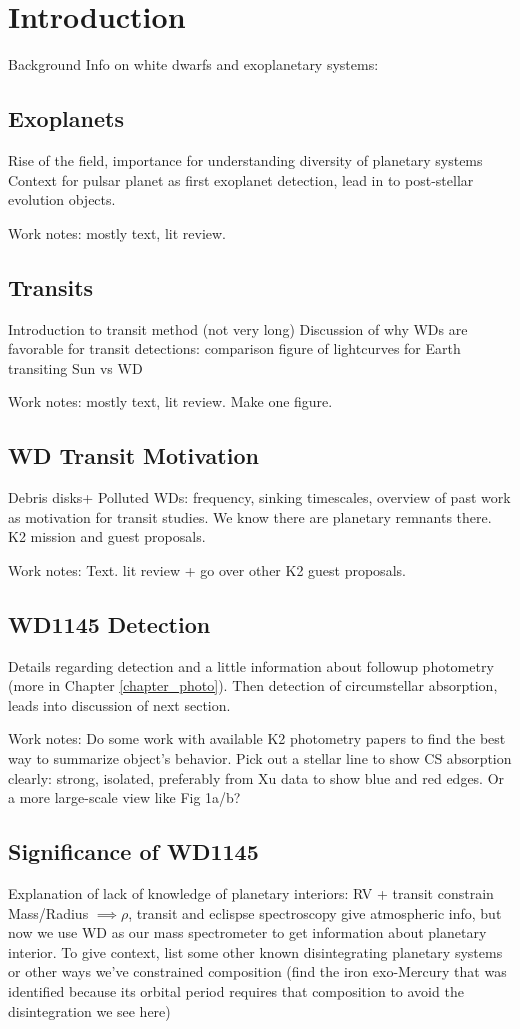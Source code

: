 \chapter{Introduction}
\label{intro}

Background Info on white dwarfs and exoplanetary systems:
\section{Exoplanets}
Rise of the field, importance for understanding diversity of planetary systems
Context for pulsar planet as first exoplanet detection, lead in to post-stellar evolution objects. 

Work notes: mostly text, lit review.
\section{Transits}
Introduction to transit method (not very long)
Discussion of why WDs are favorable for transit detections: comparison figure of lightcurves for Earth transiting Sun vs WD

Work notes: mostly text, lit review. Make one figure.
\section{WD Transit Motivation}
Debris disks+ Polluted WDs: frequency, sinking timescales, overview of past work as motivation for transit studies. We know there are planetary remnants there.
K2 mission and guest proposals.

Work notes: Text. lit review +  go over other K2 guest proposals.
\section{WD1145 Detection}
Details regarding detection and a little information about followup photometry (more in Chapter \ref{chapter_photo}). 
Then \cite{Xu2016} detection of circumstellar absorption, leads into discussion of next section.

Work notes: Do some work with available K2 photometry papers to find the best way to summarize object's behavior. Pick out a stellar line to show CS absorption clearly: strong, isolated, preferably from Xu data to show blue and red edges. Or a more large-scale view like \cite{Xu2016} Fig 1a/b?
\section{Significance of WD1145} 
Explanation of lack of knowledge of planetary interiors: RV + transit constrain Mass/Radius $\implies \rho$, transit and eclispse spectroscopy give atmospheric info, but now we use WD as our mass spectrometer to get information about planetary interior. To give context, list some other known disintegrating planetary systems or other ways we've constrained composition (find the iron exo-Mercury that was identified because its orbital period requires that composition to avoid the disintegration we see here)

